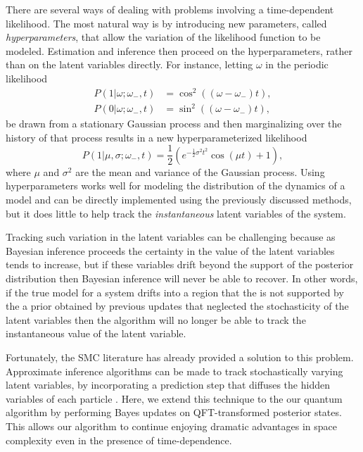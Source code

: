 \documentclass[aps,amsmath,onecolumn,amssymb,notitlepage]{revtex4-1}
\begin{document}
There are several ways of dealing with problems involving a time-dependent
likelihood. The most natural way is by introducing new parameters, called
\emph{hyperparameters}, that allow the variation of the likelihood function to
be modeled. Estimation and inference then proceed on the hyperparameters,
rather than on the latent variables directly. For instance, letting $\omega$
in the periodic likelihood 
\begin{align}
P(1 | \omega; \omega_-, t) &= \cos^2 ((\omega-\omega_-)  t),\nonumber\\
P(0 | \omega; \omega_-, t) &= \sin^2 ((\omega-\omega_-)  t),\label{eq:simple-precession}
\end{align}
 be drawn from a stationary Gaussian
process and then marginalizing over the history of that process results in a
new hyperparameterized likelihood
\begin{equation}
    P(1 | \mu, \sigma; \omega_-, t) = \frac{1}{2} \left(e^{-\frac{1}{2} \sigma ^2 t^2} \cos (\mu  t)+1\right),
\end{equation}
where $\mu$ and $\sigma^2$ are the mean and variance of the Gaussian process.
Using hyperparameters works well for modeling the distribution of the
dynamics of a model and can be directly implemented using the previously
discussed methods, but it does little to help track the \emph{instantaneous}
latent variables of the system.


Tracking such variation in the latent variables can be 
challenging because as Bayesian inference proceeds the certainty in the
value of the latent variables tends to increase, but if these variables drift beyond the support of the posterior distribution
then Bayesian inference will never be able to recover. 
In other words, if the true model for a system drifts into a region that the is not supported by the a prior obtained by previous updates that neglected
the stochasticity of the latent variables then the algorithm will no longer be able to track the instantaneous value of the latent variable.


Fortunately, the SMC literature has already provided a solution to this problem.  Approximate inference algorithms can
be made to track stochastically varying latent variables, by incorporating a prediction step that diffuses the hidden variables
of each particle \cite{isard_condensationconditional_1998}. Here, we extend this technique to the our
quantum algorithm by performing Bayes updates on QFT-transformed posterior
states. This allows our algorithm to continue enjoying dramatic advantages
in space complexity even in the presence of time-dependence.
\end{document}
